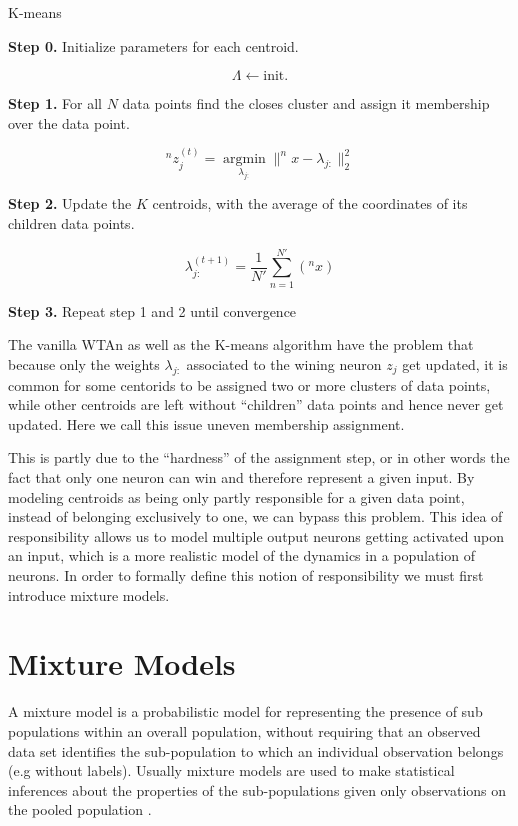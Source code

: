 \documentclass{article}
\begin{document}
\begin{algorithm}
\caption{K-means} \label{kmeans}
\begin{algorithmic}

\textbf{Step 0.} Initialize parameters for each centroid.

$$
\Lambda \leftarrow \text{init.}
$$

\textbf{Step 1.} For all $N$ data points find the closes cluster and assign it
membership over the data point.

$$
^nz^{(t)}_j = \underset{\lambda_{j:}}{\operatorname{arg min}} \| ^nx - \lambda_{j:}\|_2^2
$$

\textbf{Step 2.} Update the $K$ centroids, with the average of the coordinates of its
children data points.

$$
\lambda_{j:}^{(t+1)} = \frac{1}{N'} \sum_{n=1}^{N'} (^nx)
$$

\textbf{Step 3.} Repeat step 1 and 2 until convergence

\end{algorithmic}
\end{algorithm}

The vanilla WTAn as well as the K-means algorithm have the problem
that because only the weights \(\lambda_{j:}\) associated to the wining
neuron \(z_j\) get updated, it is common for some centorids to be
assigned two or more clusters of data points, while other centroids are
left without ``children'' data points and hence never get updated. Here
we call this issue uneven membership assignment. 


This is partly due to the ``hardness'' of the assignment step, or in other words the fact that
only one neuron can win and therefore represent a given input. By
modeling centroids as being only partly responsible for a given data
point, instead of belonging exclusively to one, we can bypass
this problem. This idea of responsibility allows us to model multiple output neurons getting
activated upon an input, which is a more realistic model of the dynamics in a population of neurons. In order to formally define this notion of responsibility we must first introduce mixture models. 

\section{Mixture Models}
A mixture model is a probabilistic model for representing the presence
of sub populations within an overall population, without requiring that
an observed data set identifies the sub-population to which an
individual observation belongs (e.g without labels). Usually mixture models are used to make
statistical inferences about the properties of the sub-populations given
only observations on the pooled population \cite{Mixture_model}.
\end{document}
